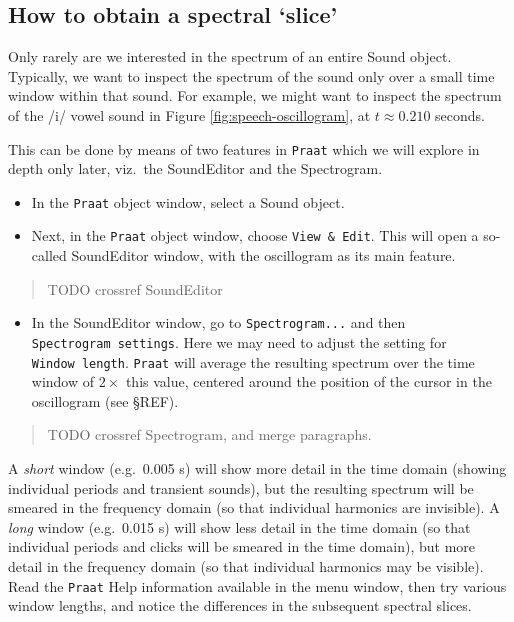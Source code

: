 \documentclass[
]{book}
\providecommand{\tightlist}{%
  \setlength{\itemsep}{0pt}\setlength{\parskip}{0pt}}
\begin{document}
\label{box-praatspectralslice}
\subsection{How to obtain a spectral `slice'}\label{how-to-obtain-a-spectral-slice}

Only rarely are we interested in the spectrum of an entire Sound object. Typically, we want to inspect the spectrum of the sound only over a small time window within that sound. For example, we might want to inspect the spectrum of the /i/ vowel sound in Figure \ref{fig:speech-oscillogram}, at \(t \approx 0.210\) seconds.

This can be done by means of two features in \texttt{Praat} which we will explore in depth only later, viz.~the SoundEditor and the Spectrogram.

\begin{itemize}
\item
  In the \texttt{Praat} object window, select a Sound object.
\item
  Next, in the \texttt{Praat} object window, choose \texttt{View\ \&\ Edit}. This will open a so-called SoundEditor window, with the oscillogram as its main feature.
\end{itemize}

\begin{quote}
TODO crossref SoundEditor
\end{quote}

\begin{itemize}
\tightlist
\item
  In the SoundEditor window, go to \texttt{Spectrogram...} and then \texttt{Spectrogram\ settings}. Here we may need to adjust the setting for \texttt{Window\ length}. \texttt{Praat} will average the resulting spectrum over the time window of \(2\times\) this value, centered around the position of the cursor in the oscillogram (see §REF).
\end{itemize}

\begin{quote}
TODO crossref Spectrogram, and merge paragraphs.
\end{quote}

A \emph{short} window (e.g.~0.005 s) will show more detail in the time domain (showing individual periods and transient sounds), but the resulting spectrum will be smeared in the frequency domain (so that individual harmonics are invisible). A \emph{long} window (e.g.~0.015 s) will show less detail in the time domain (so that individual periods and clicks will be smeared in the time domain), but more detail in the frequency domain (so that individual harmonics may be visible). Read the \texttt{Praat} Help information available in the menu window, then try various window lengths, and notice the differences in the subsequent spectral slices.
\end{document}
